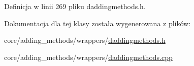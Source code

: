 Definicja w linii 269 pliku daddingmethods.\-h.



Dokumentacja dla tej klasy została wygenerowana z plików\-:\begin{DoxyCompactItemize}
\item 
core/adding\-\_\-methods/wrappers/\hyperlink{daddingmethods_8h}{daddingmethods.\-h}\item 
core/adding\-\_\-methods/wrappers/\hyperlink{daddingmethods_8cpp}{daddingmethods.\-cpp}\end{DoxyCompactItemize}
